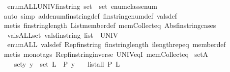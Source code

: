 \begin{isabellebody}
\isamarkupfalse%
\ enum{\isacharunderscore}ALL{\isacharcolon}{\isachardoublequoteopen}{\isacharparenleft}UNIV{\isacharcolon}{\isacharcolon}fin{\isacharunderscore}string\ set{\isacharparenright}\ {\isacharequal}\ set\ enum{\isacharunderscore}class{\isachardot}enum{\isachardoublequoteclose}\isanewline
%
\isadelimproof
\ \ %
\endisadelimproof
%
\isatagproof
{}\isamarkupfalse%
{\isacharparenleft}auto\ simp\ add{\isacharcolon}enum{\isacharunderscore}fin{\isacharunderscore}string{\isacharunderscore}def\ fin{\isacharunderscore}string{\isacharunderscore}enum{\isacharunderscore}def\ vals{\isacharunderscore}def{\isacharparenright}\isanewline
\ \ \isamarkupfalse%
{\isacharparenleft}metis\ fin{\isacharunderscore}string{\isacharunderscore}length\ List{\isachardot}member{\isacharunderscore}def\ mem{\isacharunderscore}Collect{\isacharunderscore}eq\ Abs{\isacharunderscore}fin{\isacharunderscore}string{\isacharunderscore}cases{\isacharparenright}%
\endisatagproof
{\isafoldproof}%
%
\isadelimproof
\isanewline
%
\endisadelimproof
\isanewline
{}\isamarkupfalse%
\ vals{\isacharunderscore}ALL{\isacharcolon}{\isachardoublequoteopen}set\ {\isacharparenleft}vals{\isacharcolon}{\isacharcolon}fin{\isacharunderscore}string\ list{\isacharparenright}\ {\isacharequal}\ UNIV{\isachardoublequoteclose}\isanewline
%
\isadelimproof
\ \ %
\endisadelimproof
%
\isatagproof
{}\isamarkupfalse%
\ enum{\isacharunderscore}ALL\ vals{\isacharunderscore}def\ Rep{\isacharunderscore}fin{\isacharunderscore}string\ fin{\isacharunderscore}string{\isacharunderscore}length\ ilength{\isachardot}rep{\isacharunderscore}eq\ member{\isacharunderscore}def\ \isanewline
\ \ \isamarkupfalse%
{\isacharparenleft}metis\ {\isacharparenleft}mono{\isacharunderscore}tags{\isacharparenright}\ Rep{\isacharunderscore}fin{\isacharunderscore}string{\isacharunderscore}inverse\ UNIV{\isacharunderscore}eq{\isacharunderscore}I\ mem{\isacharunderscore}Collect{\isacharunderscore}eq{\isacharparenright}%
\endisatagproof
{\isafoldproof}%
%
\isadelimproof
\isanewline
%
\endisadelimproof
\isanewline
{}\isamarkupfalse%
\ setA{\isacharcolon}\isanewline
\ \ \ set{\isacharcolon}{\isachardoublequoteopen}{\isasymAnd}y{\isachardot}\ y\ {\isasymin}\ set\ L\ {\isasymLongrightarrow}\ P\ y{\isachardoublequoteclose}\isanewline
\ \ \ {\isachardoublequoteopen}list{\isacharunderscore}all\ P\ L{\isachardoublequoteclose}\isanewline
%
\isadelimproof
\ \ %
\endisadelimproof
%
\isatagproof
{}\isamarkupfalse%

\end{isabellebody}
